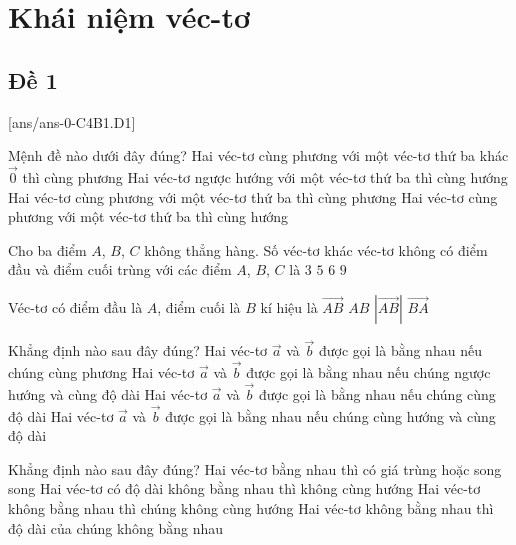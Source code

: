 \section{Khái niệm véc-tơ}

\subsection{Đề 1}
[ans/ans-0-C4B1.D1]
\caulc
\begin{ex}%
	Mệnh đề nào dưới đây đúng?
	\choice
	{\True Hai véc-tơ cùng phương với một véc-tơ thứ ba khác $\vec{0}$ thì cùng phương}
	{Hai véc-tơ ngược hướng với một véc-tơ thứ ba thì cùng hướng}
	{Hai véc-tơ cùng phương với một véc-tơ thứ ba thì cùng phương}
	{Hai véc-tơ cùng phương với một véc-tơ thứ ba thì cùng hướng}
\end{ex}

\begin{ex}%
	Cho ba điểm $A$, $B$, $C$ không thẳng hàng. Số véc-tơ khác véc-tơ không có điểm đầu và điểm cuối trùng với các điểm $A$, $B$, $C$ là
	\choice
	{$3$}
	{$5$}
	{\True $6$}
	{$9$}
\end{ex}

\begin{ex}%
	Véc-tơ có điểm đầu là $A$, điểm cuối là $B$ kí hiệu là
	\choice
	{\True $\vec{AB}$}
	{$AB$}
	{$|\vec{AB}|$}
	{$\vec{BA}$}
\end{ex}

\begin{ex}%
	Khẳng định nào sau đây đúng?
	\choice
	{Hai véc-tơ $\vec{a}$ và $\vec{b}$ được gọi là bằng nhau nếu chúng cùng phương}
	{Hai véc-tơ $\vec{a}$ và $\vec{b}$ được gọi là bằng nhau nếu chúng ngược hướng và cùng độ dài}
	{Hai véc-tơ $\vec{a}$ và $\vec{b}$ được gọi là bằng nhau nếu chúng cùng độ dài}
	{\True Hai véc-tơ $\vec{a}$ và $\vec{b}$ được gọi là bằng nhau nếu chúng cùng hướng và cùng độ dài}
\end{ex}

\begin{ex}%
	Khẳng định nào sau đây đúng?
	\choice
	{\True Hai véc-tơ bằng nhau thì có giá trùng hoặc song song}
	{Hai véc-tơ có độ dài không bằng nhau thì không cùng hướng}
	{Hai véc-tơ không bằng nhau thì chúng không cùng hướng}
	{Hai véc-tơ không bằng nhau thì độ dài của chúng không bằng nhau}
\end{ex}


